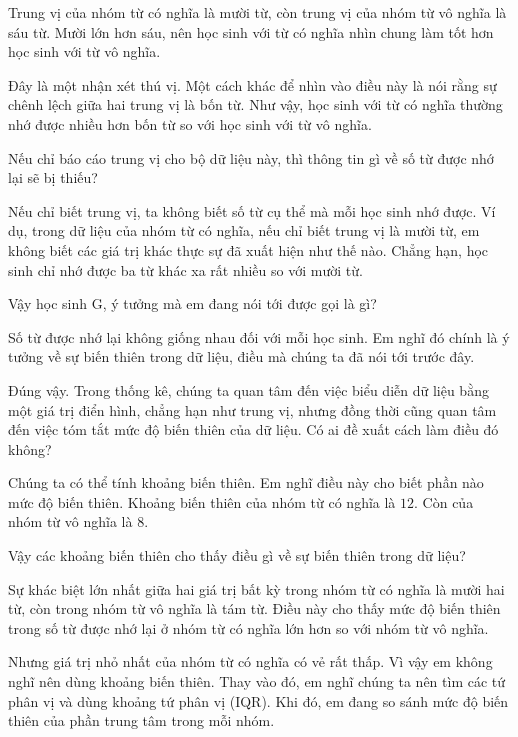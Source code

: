 \documentclass[
  10pt,
  a4paper,
  landscape,
  twoside,
  openany
]{scrbook}
\newlength{\scriptlabelwidth}
\newcommand{\scriptlabel}[1]{%
  \normalfont\slshape\makebox[\scriptlabelwidth][l]{#1}%
}
\newenvironment{scriptlist}{%
  \begin{list}{}{%
    \setlength{\labelwidth}{\scriptlabelwidth}%
    \setlength{\labelsep}{0.6em}%
    \setlength{\leftmargin}{\dimexpr\labelwidth+\labelsep\relax}%
    \setlength{\itemindent}{0pt}%
    \setlength{\listparindent}{0pt}%
    \setlength{\parsep}{0pt}%
    \setlength{\itemsep}{0.35\baselineskip}%
    \setlength{\topsep}{0.35\baselineskip}%
    \let\makelabel\scriptlabel
  }%
}{%
  \end{list}%
}
\begin{document}
{\begin{scriptlist}
  \item [Học sinh F:] Trung vị của nhóm từ có nghĩa là mười từ, còn trung vị của nhóm từ vô nghĩa là sáu từ. Mười lớn hơn sáu, nên học sinh với từ có nghĩa nhìn chung làm tốt hơn học sinh với từ vô nghĩa.
  \item [Giáo viên:]Đây là một nhận xét thú vị. Một cách khác để nhìn vào điều này là nói rằng sự chênh lệch giữa hai trung vị là bốn từ. Như vậy, học sinh với từ có nghĩa thường nhớ được nhiều hơn bốn từ so với học sinh với từ vô nghĩa.
  \item [Giáo viên:] Nếu chỉ báo cáo trung vị cho bộ dữ liệu này, thì thông tin gì về số từ được nhớ lại sẽ bị thiếu?
  \item [Học sinh G:] Nếu chỉ biết trung vị, ta không biết số từ cụ thể mà mỗi học sinh nhớ được. Ví dụ, trong dữ liệu của nhóm từ có nghĩa, nếu chỉ biết trung vị là mười từ, em không biết các giá trị khác thực sự đã xuất hiện như thế nào. Chẳng hạn, học sinh chỉ nhớ được ba từ khác xa rất nhiều so với mười từ.
  \item [Giáo viên:] Vậy học sinh G, ý tưởng mà em đang nói tới được gọi là gì?
  \item [Học sinh G:] Số từ được nhớ lại không giống nhau đối với mỗi học sinh. Em nghĩ đó chính là ý tưởng về sự biến thiên trong dữ liệu, điều mà chúng ta đã nói tới trước đây.
  \item [Giáo viên:] Đúng vậy. Trong thống kê, chúng ta quan tâm đến việc biểu diễn dữ liệu bằng một giá trị điển hình, chẳng hạn như trung vị, nhưng đồng thời cũng quan tâm đến việc tóm tắt mức độ biến thiên của dữ liệu. Có ai đề xuất cách làm điều đó không?
  \item [Học sinh H:] Chúng ta có thể tính khoảng biến thiên. Em nghĩ điều này cho biết phần nào mức độ biến thiên. Khoảng biến thiên của nhóm từ có nghĩa là $12$. Còn của nhóm từ vô nghĩa là $8$.
  \item [Giáo viên:] Vậy các khoảng biến thiên cho thấy điều gì về sự biến thiên trong dữ liệu?
  \item [Học sinh H:] Sự khác biệt lớn nhất giữa hai giá trị bất kỳ trong nhóm từ có nghĩa là mười hai từ, còn trong nhóm từ vô nghĩa là tám từ. Điều này cho thấy mức độ biến thiên trong số từ được nhớ lại ở nhóm từ có nghĩa lớn hơn so với nhóm từ vô nghĩa.
  \item [Học sinh I:] Nhưng giá trị nhỏ nhất của nhóm từ có nghĩa có vẻ rất thấp. Vì vậy em không nghĩ nên dùng khoảng biến thiên. Thay vào đó, em nghĩ chúng ta nên tìm các tứ phân vị và dùng khoảng tứ phân vị (IQR). Khi đó, em đang so sánh mức độ biến thiên của phần trung tâm trong mỗi nhóm.

\end{scriptlist}}
\end{document}
